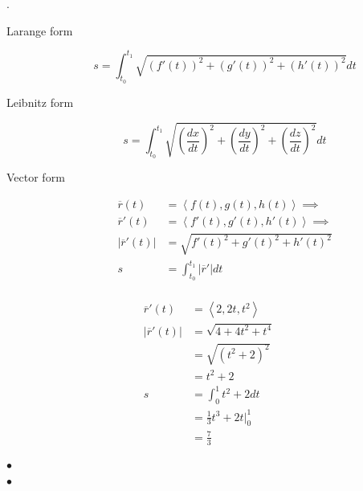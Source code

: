 \begin{definition} .

	\begin{description}
		\item[Larange form]
			\[s = \int_{t_0}^{t_1} \sqrt{(f'(t))^2 + (g'(t))^2 + (h'(t))^2} dt \]
		\item[Leibnitz form]
			\[s = \int_{t_0}^{t_1} \sqrt{(\frac{dx}{dt})^2 + (\frac{dy}{dt})^2 + (\frac{dz}{dt})^2} dt \]
		\item[Vector form]
			\begin{align*}
				\overline{r}(t) &=  \left<f(t), g(t),h(t) \right> \implies \\
				\overline{r}'(t) &=  \left<f'(t), g'(t),h'(t) \right> \implies \\
				\left|   \overline{r}'(t) \right|&= \sqrt{  f'(t)^2+ g'(t)^2+h'(t)^2  }\\
				s &= \int_{t_0}^{t_1} \left| \overline{r}' \right| dt  \\
			\end{align*}
	\end{description}
\end{definition}

\begin{example}
	\begin{align*}
		\overline{r}'(t) &=  \left<2, 2t, t^2 \right> \\
		\left| \overline{r}'(t) \right| &= \sqrt{4 + 4t^2 +t^4}  \\
										&= \sqrt{(t^2+2)^2}  \\
										&= t^2 + 2 \\
		s &= \int_{0}^{1} t^2 + 2 dt \\
		  &= \frac{1}{3}t^3 + 2t \biggr\rvert_{0}^{1}   \\
		  &= \boxed{\frac{7}{3}} \\
	\end{align*}
\end{example}

\begin{definition}
\smallskip\hfill$\bullet$\end{definition}

\begin{definition}
\smallskip\hfill$\bullet$\end{definition}

